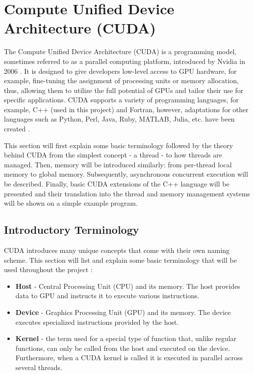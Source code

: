 \section{Compute Unified Device Architecture (CUDA)}\label{Section:theory-CUDA}
The Compute Unified Device Architecture (CUDA) is a programming model, sometimes referred to as a parallel computing platform, introduced by Nvidia in 2006 \cite{Oh10September2012}. It is designed to give developers low-level access to GPU hardware, for example, fine-tuning the assignment of processing units or memory allocation, thus, allowing them to utilize the full potential of GPUs and tailor their use for specific applications. CUDA supports a variety of programming languages, for example, C++ (used in this project) and Fortran, however, adaptations for other languages such as Python, Perl, Java, Ruby, MATLAB, Julia, etc. have been created \cite{OsGyRFLMngy0j8Pv}.
\par This section will first explain some basic terminology followed by the theory behind CUDA from the simplest concept - a thread - to how threads are managed. Then, memory will be introduced similarly: from per-thread local memory to global memory. Subsequently, asynchronous concurrent execution will be described. Finally, basic CUDA extensions of the C++ language will be presented and their translation into the thread and memory management systems will be shown on a simple example program.

\subsection{Introductory Terminology}\label{Subsection:theory-CUDA-introductory-terminology}
CUDA introduces many unique concepts that come with their own naming scheme. This section will list and explain some basic terminology that will be used throughout the project \cite{Ruetsch2008}:
\begin{itemize}
	\item \textbf{Host} - Central Processing Unit (CPU) and its memory. The host provides data to GPU and instructs it to execute various instructions.
	\item \textbf{Device} - Graphics Processing Unit (GPU) and its memory. The device executes specialized instructions provided by the host.
	\item \textbf{Kernel} - the term used for a special type of function that, unlike regular functions, can only be called from the host and executed on the device. Furthermore, when a CUDA kernel is called it is executed in parallel across several threads.	
\end{itemize}

